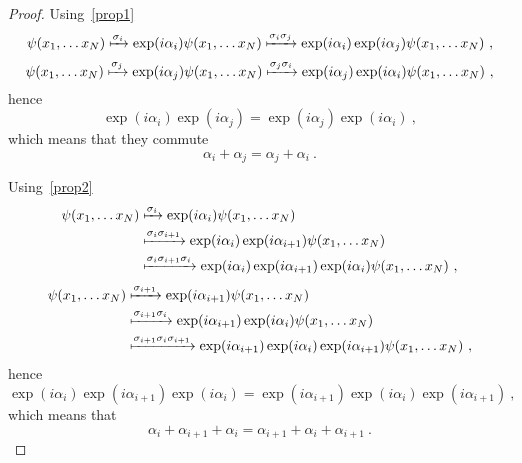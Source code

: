     \begin{proof}
        Using~\eqref{prop1}
        \begin{equation*}
            \psi(x_1, \ldots x_N) \xmapsto{\sigma_i} \exp(i \alpha_i) \psi(x_1, \ldots x_N)\xmapsto{\sigma_i \sigma_j} \exp(i \alpha_i) \exp(i \alpha_j) \psi(x_1, \ldots x_N) ~,
        \end{equation*}
        \begin{equation*}
            \psi(x_1, \ldots x_N) \xmapsto{\sigma_j} \exp(i \alpha_j) \psi(x_1, \ldots x_N)\xmapsto{\sigma_j \sigma_i} \exp(i \alpha_j) \exp(i \alpha_i) \psi(x_1, \ldots x_N) ~,
        \end{equation*}
        hence 
        \begin{equation*}
            \exp(i \alpha_i) \exp(i \alpha_j) = \exp(i \alpha_j) \exp(i \alpha_i) ~,
        \end{equation*}
        which means that they commute
        \begin{equation}\label{pr1}
            \alpha_i + \alpha_j = \alpha_j +\alpha_i ~.
        \end{equation}

        Using~\eqref{prop2}
        \begin{equation*}
        \begin{aligned}
            \psi(x_1, \ldots x_N) & \xmapsto{\sigma_i} \exp(i \alpha_i) \psi(x_1, \ldots x_N) \\ & \xmapsto{\sigma_i \sigma_{i+1}} \exp(i \alpha_i) \exp(i \alpha_{i+1}) \psi(x_1, \ldots x_N) \\ & \xmapsto{\sigma_i \sigma_{i+1} \sigma_i} \exp(i \alpha_i) \exp(i \alpha_{i+1}) \exp(i \alpha_i) \psi(x_1, \ldots x_N) ~,
        \end{aligned}
        \end{equation*}
        \begin{equation*}
        \begin{aligned}
            \psi(x_1, \ldots x_N) & \xmapsto{\sigma_{i+1}} \exp(i \alpha_{i+1}) \psi(x_1, \ldots x_N) \\ & \xmapsto{\sigma_{i+1} \sigma_i} \exp(i \alpha_{i+1}) \exp(i \alpha_i) \psi(x_1, \ldots x_N) \\ & \xmapsto{\sigma_{i+1} \sigma_i \sigma_{i+1} } \exp(i \alpha_{i+1}) \exp(i \alpha_i) \exp(i \alpha_{i+1}) \psi(x_1, \ldots x_N) ~,
        \end{aligned}
        \end{equation*}
        hence 
        \begin{equation*}
            \exp(i \alpha_i) \exp(i \alpha_{i+1}) \exp(i \alpha_i) = \exp(i \alpha_{i+1}) \exp(i \alpha_i) \exp(i \alpha_{i+1}) ~,
        \end{equation*}
        which means that 
        \begin{equation}\label{pr2}
           \alpha_i + \alpha_{i+1} + \alpha_i = \alpha_{i+1} + \alpha_i + \alpha_{i+1} ~. 
        \end{equation}
        

\end{proof}
